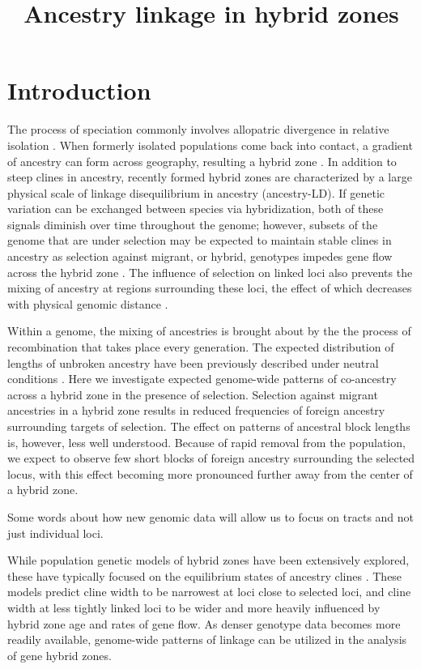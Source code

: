 \documentclass[12pt]{article}
\title{Ancestry linkage in hybrid zones}
\author{}
\date{} %
\begin{document}
\maketitle

\section{Introduction}
The process of speciation commonly involves allopatric divergence in relative isolation \citep{Coyne2004}. When formerly isolated populations come back into contact, a gradient of ancestry can form across geography, resulting a hybrid zone \citep{Barton1985}. In addition to steep clines in ancestry, recently formed hybrid zones are characterized by a large physical scale of linkage disequilibrium in ancestry (ancestry-LD). If genetic variation can be exchanged between species via hybridization, both of these signals diminish over time throughout the genome; however, subsets of the genome that are under selection may be expected to maintain stable clines in ancestry as selection against migrant, or hybrid, genotypes impedes gene flow across the hybrid zone \citep{Barton1979a}. The influence of selection on linked loci also prevents the mixing of ancestry at regions surrounding these loci, the effect of which decreases with physical genomic distance \citep{Barton1986}.


Within a genome, the mixing of ancestries is brought about by the the process of recombination that takes place every generation. The expected distribution of lengths of unbroken ancestry have been previously described under neutral conditions \cite[e.g.][]{Gravel2012,Sedghifar2015}. Here we investigate expected genome-wide patterns of co-ancestry across a hybrid zone in the presence of selection. Selection against migrant ancestries in a hybrid zone results in reduced frequencies of foreign ancestry surrounding targets of selection. The effect on patterns of ancestral block lengths is, however, less well understood. Because of rapid removal from the population, we expect to observe few short blocks of foreign ancestry surrounding the selected locus, with this effect becoming more pronounced further away from the center of a hybrid zone.

Some words about how new genomic data will allow us to focus on tracts and not just individual loci. 

While population genetic models of hybrid zones have been extensively explored, these have typically focused on the equilibrium states of ancestry clines \cite{Barton1979a,Barton1986}. These models predict cline width to be narrowest at loci close to selected loci, and cline width at less tightly linked loci to be wider and more heavily influenced by hybrid zone age and rates of gene flow. As denser genotype data becomes more readily available, genome-wide patterns of linkage can be utilized in the analysis of gene hybrid zones. 
\end{document}
